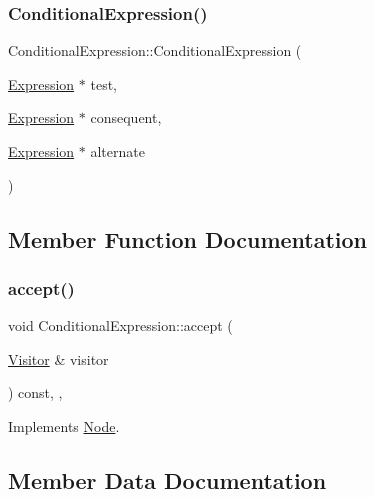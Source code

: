 \subsubsection{\texorpdfstring{Conditional\+Expression()}{ConditionalExpression()}}
{\footnotesize\ttfamily Conditional\+Expression\+::\+Conditional\+Expression (\begin{DoxyParamCaption}\item[{\hyperlink{struct_expression}{Expression} $\ast$}]{test,  }\item[{\hyperlink{struct_expression}{Expression} $\ast$}]{consequent,  }\item[{\hyperlink{struct_expression}{Expression} $\ast$}]{alternate }\end{DoxyParamCaption})\hspace{0.3cm}{\ttfamily [inline]}}



\subsection{Member Function Documentation}
\mbox{\label{struct_conditional_expression_af3883c99eba0226e3fbd424a672bcf7b}} 
\subsubsection{\texorpdfstring{accept()}{accept()}}
{\footnotesize\ttfamily void Conditional\+Expression\+::accept (\begin{DoxyParamCaption}\item[{\hyperlink{struct_visitor}{Visitor} \&}]{visitor }\end{DoxyParamCaption}) const\hspace{0.3cm}{\ttfamily [inline]}, {\ttfamily [override]}, {\ttfamily [virtual]}}



Implements \hyperlink{struct_node_a10bd7af968140bbf5fa461298a969c71}{Node}.



\subsection{Member Data Documentation}
\mbox{\label{struct_conditional_expression_aed7b09dab98000c8542d6353eefd8dac}} 
